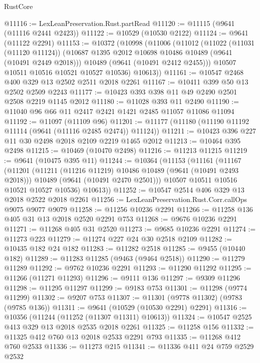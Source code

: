 \begin{lexlean}{RustCore}
\begin{coremodule}
@11116 := LexLeanPreservation.Rust.partRead
@11120 := @11115 (@9641 (@11116 @2441 @2423))
@11122 := @10529 (@10530 @2122)
@11124 := @9641 (@11122 @2291)
@11153 := @10372
    (@10998
      (@11006
        (@11012
          (@11022
            (@11031 (@11120 @11124))
            (@10687 @1395 @2012 @10698 @10486 @10489 (@9641 (@10491 @2449 @2018)))
            @10489
            (@9641 (@10491 @2412 @2455)))
          @10507
          @10511
          @10516
          @10521
          @10527
          @10536)
        @10613))
@11161 := @10547 @2468 @400 @329 @13 @2502 @2511 @2018 @2261
@11167 := @10411 @399 @50 @13 @2502 @2509 @2243
@11177 := @10423 @393 @398 @11 @49 @2490 @2501 @2508 @2219 @1145 @2012
@11180 := @11028 @393 @11 @2490
@11190 := @11040 @96 @66 @11 @2417 @2421 @1421 @2485 @11057 @11086 @11094
@11192 := @11097 (@11109 @96)
@11201 := @11177 (@11180 (@11190 @11192 @11114 (@9641 (@11116 @2485 @2474)) @11124))
@11211 := @10423 @396 @227 @11 @30 @2498 @2018 @2109 @2219 @1465 @2012
@11213 := @10464 @395 @2498
@11215 := @10469 (@10470 @2498)
@11216 := @11213 @11215
@11219 := @9641 (@10475 @395 @11)
@11244 := @10364
    (@11153
      (@11161
        (@11167
          (@11201
            (@11211 (@11216 @11219) @10486 @10489 (@9641 (@10491 @2493 @2018)))
            @10489
            (@9641 (@10491 @2470 @2501)))
          @10507
          @10511
          @10516
          @10521
          @10527
          @10536)
        @10613))
@11252 := @10547 @2514 @406 @329 @13 @2018 @2522 @2018 @2261
@11256 := LexLeanPreservation.Rust.Corr.callOps @9075 @9077 @9079
@11258 := @11256 @10236 @2291
@11266 := @11258 @136 @405 @31 @13 @2018 @2520 @2291 @753
@11268 := @9676 @10236 @2291
@11271 := @11268 @405 @31 @2520
@11273 := @9685 @10236 @2291
@11274 := @11273 @223
@11279 := @11274 @227 @24 @30 @2518 @2109
@11282 := @10435 @182 @24 @182
@11283 := @11282 @2518
@11285 := @9455 (@10440 @182)
@11289 := @11283 @11285 (@9463 (@9464 @2518))
@11290 := @11279 @11289
@11292 := @9762 @10236 @2291
@11293 := @11290 @11292
@11295 := @11266 (@11271 @11293)
@11296 := @9111 @136
@11297 := @9309 @11296
@11298 := @11295 @11297
@11299 := @9183 @753
@11301 := @11298 (@9774 @11299)
@11302 := @9207 @753
@11307 := @11301 (@9778 @11302) (@9783 (@9785 @136))
@11311 := @9641 (@10529 (@10530 @2291) @2291)
@11316 := @10356 (@11244 (@11252 (@11307 @11311) @10613))
@11324 := @10547 @2525 @413 @329 @13 @2018 @2535 @2018 @2261
@11325 := @11258 @156
@11332 := @11325 @412 @760 @13 @2018 @2533 @2291 @793
@11335 := @11268 @412 @760 @2533
@11336 := @11273 @215
@11341 := @11336 @411 @24 @759 @2529 @2532

\end{coremodule}
\end{lexlean}

